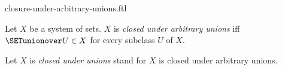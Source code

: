 \documentclass{naproche-library}
\begin{document}
\begin{smodule}[title=Closure Under Arbitrary Unions]{closure-under-arbitrary-unions.ftl}

\begin{definition}[forthel,id=FOUNDATIONS_14_3959378992431104]
  Let $X$ be a system of sets.
  $X$ is \emph{closed under arbitrary unions} iff $\SETunionover U \in X$ for every  subclass $U$ of $X$.

  Let $X$ is \emph{closed under unions} stand for $X$ is closed under arbitrary unions.
\end{definition}
\end{smodule}
\end{document}
